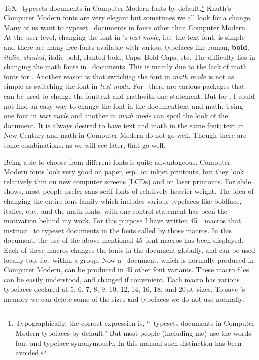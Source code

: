 {{\hbox{ \TeX\ }\vskip-14.5mm\ii {} typesets documents in Computer Modern fonts by default.\footnote{Typographically, the correct expression is, ``\capstex\ typesets documents in Computer Modern typefaces by default.'' But most people (including me) use the words {\eightit font\/} and {\eightit typeface\/} synonymously. In this manual such distinction has been avoided.} Knuth's Computer Modern fonts are very elegant but sometimes we all look for a change. Many of us want to typeset \capstex\ documents in fonts other than Computer Modern. At the user level, changing the font in \capstex's {\sl text mode}, i.e.\ the text font, is simple and there are many free fonts available with various typefaces like {\rm roman}, {\bf bold}, {\it italic}, {\sl slanted}, {\itbf italic bold}, {\slbf slanted bold}, {\caps Caps}, {\capsbf Bold Caps}, etc. The difficulty lies in changing the math fonts in \capstex\ documents. This is mainly due to the lack of math fonts for \capstex. Another reason is that switching the font in {\sl math mode\/} is not as simple as switching the font in {\sl text mode}. For \capslatex\ there are various packages that can be used to change the font\emdash text and math\emdash with one statement. But for \capstex, I could not find an easy way to change the font in the document\emdash text and math. Using one font in {\sl text mode\/} and another in {\sl math mode\/} can spoil the look of the document. It is always desired to have text and math in the same font; text in New Century and math in Computer Modern do not go well. Though there are some combinations, as we will see later, that go well.

Being able to choose from different fonts is quite advantageous. Computer Modern fonts look very good on paper, esp.\ on inkjet printouts, but they look relatively thin on new computer screens (LCDs) and on laser printouts. For slide shows, most people prefer sans-serif fonts of relatively heavier weight. The idea of changing the entire font family which includes various typefaces like boldface, italics, etc., and the math fonts, with one control statement has been the motivation behind my work. For this purpose I have written 45~\capstex\ macros that instruct \capstex\ to typeset documents in the fonts called by those macros. In this document, the use of the above mentioned 45~font macros has been displayed. Each of these macros changes the fonts in the document globally, and can be used locally too, i.e.\ within a group. Now a \capstex\ document, which is normally produced in Computer Modern, can be produced in 45 other font variants. These macro files can be easily understood, and changed if convenient. Each macro has various typefaces declared at 5, 6, 7, 8, 9, 10, 12, 14, 16, 18, and 20\,pt~sizes. To save \capstex's memory we can delete some of the sizes and typefaces we do not use normally.

}}
